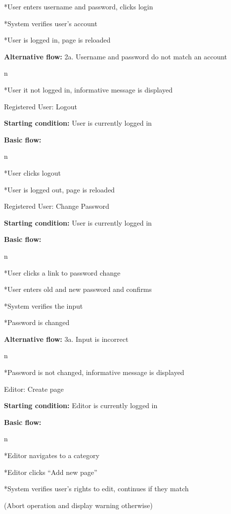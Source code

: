 *User enters username and password, clicks login

*System verifies user’s account

*User is logged in, page is reloaded

\enditems

{\bf Alternative flow:} 2a. Username and password do not match an account

\begitems \style n

*User it not logged in, informative message is displayed

\enditems

\secc Registered User: Logout

{\bf Starting condition:} User is currently logged in

{\bf Basic flow:}

\begitems \style n

*User clicks logout

*User is logged out, page is reloaded

\enditems

\secc Registered User: Change Password

{\bf Starting condition:} User is currently logged in

{\bf Basic flow:}

\begitems \style n

*User clicks a link to password change

*User enters old and new password and confirms

*System verifies the input

*Password is changed

\enditems

{\bf Alternative flow:} 3a. Input is incorrect

\begitems \style n

*Password is not changed, informative message is displayed

\enditems

\secc Editor: Create page

{\bf Starting condition:} Editor is currently logged in

{\bf Basic flow:}

\begitems \style n

*Editor navigates to a category

*Editor clicks “Add new page”

*System verifies user’s rights to edit, continues if they match

(Abort operation and display warning otherwise)

